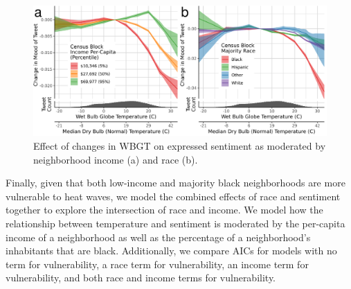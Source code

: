 \documentclass[fleqn,10pt]{wlscirep}
\begin{document}
\begin{figure}[H]
\centering
  \includegraphics[width=\linewidth]{../res/wbgt_combined.png}
    \caption{Effect of changes in WBGT on expressed sentiment as moderated by neighborhood income (a) and race (b).}
\label{fig:hetero}
\end{figure}

Finally, given that both low-income and majority black neighborhoods are more vulnerable to heat waves, we model the combined effects of race and sentiment together to explore the intersection of race and income.  We model how the relationship between temperature and sentiment is moderated by the per-capita income of a neighborhood as well as the percentage of a neighborhood's inhabitants that are black.  Additionally, we compare AICs for models with no term for vulnerability, a race term for vulnerability, an income term for vulnerability, and both race and income terms for vulnerability.
\end{document}

